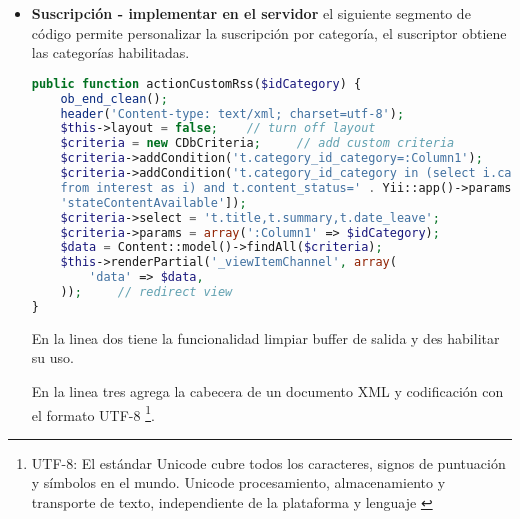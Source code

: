 \begin{itemize}

\item \textbf{Suscripción - implementar en el servidor} el
siguiente segmento de código permite personalizar la suscripción por
categoría, el suscriptor obtiene las categorías habilitadas. 

\begin{lstlisting}[language=PHP, caption={Personalización de suscriptor.}]
public function actionCustomRss($idCategory) {
    ob_end_clean();
    header('Content-type: text/xml; charset=utf-8');
    $this->layout = false;    // turn off layout
    $criteria = new CDbCriteria;     // add custom criteria
    $criteria->addCondition('t.category_id_category=:Column1');
    $criteria->addCondition('t.category_id_category in (select i.category_id_category
    from interest as i) and t.content_status=' . Yii::app()->params[
    'stateContentAvailable']);
    $criteria->select = 't.title,t.summary,t.date_leave';
    $criteria->params = array(':Column1' => $idCategory);
    $data = Content::model()->findAll($criteria);
    $this->renderPartial('_viewItemChannel', array(
        'data' => $data,
    ));     // redirect view
}
\end{lstlisting}

En la linea dos tiene la funcionalidad limpiar buffer de salida y
des habilitar su uso.

En la linea tres agrega la cabecera de un documento XML y codificación con
el formato UTF-8 \footnote{UTF-8: El estándar Unicode cubre todos
los caracteres, signos de puntuación y símbolos en el mundo. Unicode 
procesamiento, almacenamiento y transporte de texto, independiente de la 
plataforma y lenguaje \cite{utf8}}.


\end{itemize}
